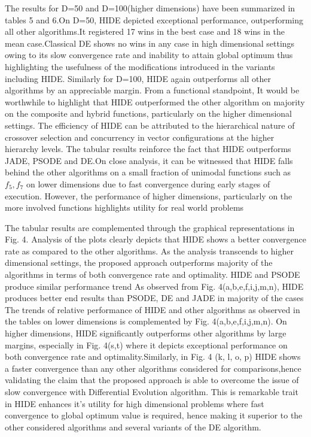 The results for D=50 and D=100(higher dimensions) have been summarized in tables 5 and 6.On D=50, HIDE depicted exceptional performance, outperforming all other algorithms.It registered 17 wins in the best case and 18 wins in the mean case.Classical DE shows no wins in any case in high dimensional settings owing to its slow convergence rate and inability to attain global optimum thus highlighting the usefulness of the modifications introduced in the variants including HIDE. Similarly for D=100, HIDE again outperforms all other algorithms by an appreciable margin.
From a functional standpoint, It would be worthwhile to highlight that HIDE outperformed the other algorithm on majority on the composite and hybrid functions, particularly on the higher dimensional settings. The efficiency of HIDE can be attributed to the hierarchical nature of crossover selection and concurrency in vector configurations at the higher hierarchy levels.
The tabular results reinforce the fact that HIDE outperforms JADE, PSODE and DE.On close analysis, it can be witnessed that HIDE falls behind the other algorithms on a small fraction of unimodal functions such as $f_5, f_7$ on lower dimensions due to fast convergence during early stages of execution. However, the performance of higher dimensions, particularly on the more involved functions highlights utility for real world problems 

The tabular results are complemented through the graphical representations in Fig. 4. Analysis of the plots clearly depicts that HIDE shows a better convergence rate as compared to the other algorithms. As the analysis transcends to higher dimensional settings, the proposed approach outperforms majority of the algorithms in terms of both convergence rate and optimality. HIDE and PSODE produce similar performance trend As observed from Fig. 4(a,b,e,f,i,j,m,n), HIDE produces better end results than PSODE, DE and JADE in majority of the cases 
The trends of relative performance of HIDE and other algorithms as observed in the tables on lower dimensions is complemented by Fig. 4(a,b,e,f,i,j,m,n). On higher dimensions, HIDE significantly outperforms other algorithms by large margins, especially in Fig. 4(s,t) where it depicts exceptional performance on both convergence rate and optimality.Similarly, in Fig. 4 (k, l, o, p) HIDE shows a
faster convergence than any other algorithms considered for comparisons,hence validating the claim that the proposed approach is able to overcome the issue of slow convergence with Differential Evolution algorithm. This is remarkable trait in HIDE enhances it’s utility for high dimensional problems where fast convergence to global optimum value is required, hence making it superior to the other considered algorithms and several variants of the DE algorithm.

